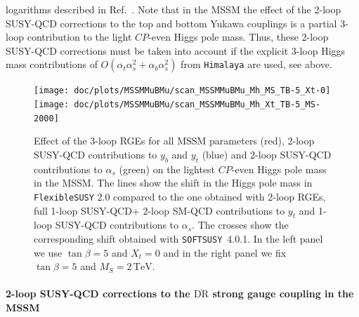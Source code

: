 \documentclass[final,3p,11pt,pdflatex]{elsarticle}
\makeatletter
\newcommand{\fs}{\texttt{FlexibleSUSY}\@\xspace}
\newcommand{\softsusy}{\texttt{SOFTSUSY}\@\xspace}
\newcommand{\Himalaya}{\texttt{Himalaya}\@\xspace}
\newcommand{\fstwo}{\fs 2.0\@\xspace}
\newcommand{\ol}[1]{\overline{#1}}
\newcommand{\DRbar}{\ensuremath{\ol{\text{DR}}}\xspace}
\newcommand{\unit}[1]{\,\text{#1}}      %
\newcommand{\MS}{\ensuremath{M_S}\xspace}
\newcommand{\CP}{\ensuremath{CP}\xspace}
\newcommand{\SQCD}{SUSY-QCD\xspace}
\def\at{\alpha_t}
\def\ab{\alpha_b}
\def\as{\alpha_s}
\makeatother
\begin{document}
logarithms described in Ref.~\cite{Athron:2016fuq}.
%
Note that in the MSSM the effect of the 2-loop \SQCD corrections to
the top and bottom Yukawa couplings is a partial 3-loop contribution
to the light \CP-even Higgs pole mass.  Thus, these 2-loop \SQCD corrections
must be taken into account if the explicit 3-loop Higgs mass
contributions of $O(\at \as^2 + \ab \as^2)$ from
\Himalaya are used, see above.
%
\begin{figure}[tbh]
  \centering
  \texttt{[image: doc/plots/MSSMMuBMu/scan\_MSSMMuBMu\_Mh\_MS\_TB-5\_Xt-0]}\hfill
  \texttt{[image: doc/plots/MSSMMuBMu/scan\_MSSMMuBMu\_Mh\_Xt\_TB-5\_MS-2000]}
  \caption{Effect of the 3-loop RGEs for all MSSM parameters (red),
    2-loop \SQCD contributions to $y_b$ and $y_t$ (blue) and 2-loop
    \SQCD contributions to $\as$ (green) on the lightest \CP-even
    Higgs pole mass in the MSSM\@.  The lines show the shift in the
    Higgs pole mass in \fstwo compared to the one obtained with 2-loop
    RGEs, full 1-loop \SQCD + 2-loop SM-QCD contributions to $y_t$ and
    1-loop \SQCD contributions to $\as$.  The crosses show the
    corresponding shift obtained with \softsusy~4.0.1.  In the left
    panel we use $\tan\beta = 5$ and $X_t = 0$ and in the right panel
    we fix $\tan\beta = 5$ and $\MS = 2\unit{TeV}$.}
  \label{fig:MSSMMuBMu}
\end{figure}

\paragraph{2-loop \SQCD corrections to the \DRbar strong gauge coupling in the MSSM}
\end{document}
